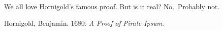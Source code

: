 We all love Hornigold's famous proof. But is it real? No.~Probably not.

\hypertarget{refs}{}
\begin{CSLReferences}{1}{0}
\leavevmode{}%
Hornigold, Benjamin. 1680. \emph{A Proof of Pirate Ipsum}.

\end{CSLReferences}
